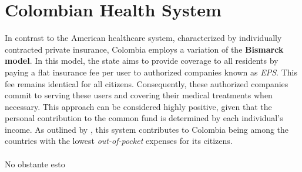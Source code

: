 \documentclass[11pt]{article}
\begin{document}
\section{Colombian Health System}

\begin{flushleft}

    In contrast to the American healthcare system, characterized by individually contracted private insurance, Colombia employs a variation of the \textbf{Bismarck model}. In this model, the state aims to provide coverage to all residents by paying a flat insurance fee per user to authorized companies known as \textit{EPS}. This fee remains identical for all citizens. Consequently, these authorized companies commit to serving these users and covering their medical treatments when necessary. This approach can be considered highly positive, given that the personal contribution to the common fund is determined by each individual's income. As outlined by \citet{perez2015mirada}, this system contributes to Colombia being among the countries with the lowest \textit{out-of-pocket} expenses for its citizens.\\~\\

    No obstante esto 



\end{flushleft}
\end{document}

